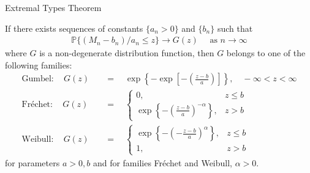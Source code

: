 \documentclass[10pt]{beamer}
\begin{document}
\begin{frame}{Extremal Types Theorem}
\begin{theorem}\label{thm:gfw}
If there exists sequences of constants $\{a_n>0\}$ and $\{b_n\}$ such that 
\begin{align*}
\mathbb{P}\{(M_n-b_n)/a_n \leq z\} \to G(z) \quad \text{ as } n \to \infty
\end{align*}
where $G$ is a non-degenerate distribution function, then $G$ belongs to one of the following families:
\begin{align*}
\text{Gumbel}:\quad G(z)\quad&= \quad\exp \left\{-\exp\left[-\left(\frac{z-b}{a}\right)\right]\right\}, \quad -\infty<z<\infty\\
\text{Fr\'echet}: \quad G(z)\quad&= \quad\begin{cases}
0, & z \leq b\\
\exp\left\{-\left(\frac{z-b}{a}\right)^{-\alpha}\right\}, &z >b
\end{cases}
\\
\text{Weibull}:\quad G(z)\quad&=  \quad\begin{cases}
\exp\left\{-\left(-\frac{z-b}{a}\right)^{\alpha}\right\}, & z \leq b\\
1, &z >b
\end{cases}
\end{align*}
for parameters $a>0, b$ and for families Fr\'echet and Weibull, $\alpha >0$.
\end{theorem}
\end{frame}


\end{document}
